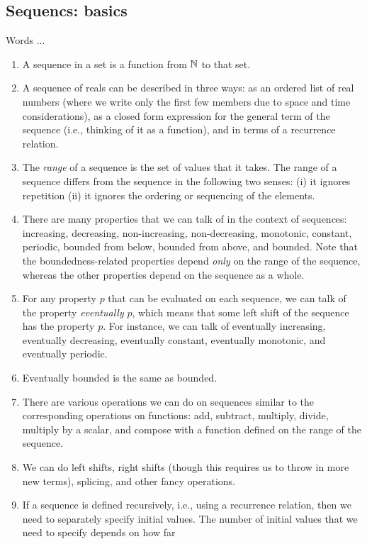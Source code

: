 \documentclass[10pt]{amsart}
\begin{document}
\subsection{Sequencs: basics}
Words ...

\begin{enumerate}
\item A sequence in a set is a function from $\mathbb{N}$ to that set.
\item A sequence of reals can be described in three ways: as an
  ordered list of real numbers (where we write only the first few
  members due to space and time considerations), as a closed form
  expression for the general term of the sequence (i.e., thinking of
  it as a function), and in terms of a recurrence relation.
\item The {\em range} of a sequence is the set of values that it
  takes. The range of a sequence differs from the sequence in the
  following two senses: (i) it ignores repetition (ii) it ignores the
  ordering or sequencing of the elements.
\item There are many properties that we can talk of in the context of
  sequences: increasing, decreasing, non-increasing, non-decreasing,
  monotonic, constant, periodic, bounded from below, bounded from
  above, and bounded. Note that the boundedness-related properties
  depend {\em only} on the range of the sequence, whereas the other
  properties depend on the sequence as a whole.
\item For any property $p$ that can be evaluated on each sequence, we
  can talk of the property {\em eventually} $p$, which means that some
  left shift of the sequence has the property $p$. For instance, we
  can talk of eventually increasing, eventually decreasing, eventually
  constant, eventually monotonic, and eventually periodic.
\item Eventually bounded is the same as bounded.
\item There are various operations we can do on sequences similar to
  the corresponding operations on functions: add, subtract, multiply,
  divide, multiply by a scalar, and compose with a function defined on
  the range of the sequence.
\item We can do left shifts, right shifts (though this requires us to
  throw in more new terms), splicing, and other fancy operations.
\item If a sequence is defined recursively, i.e., using a recurrence
  relation, then we need to separately specify initial values. The
  number of initial values that we need to specify depends on how far

\end{enumerate}
\end{document}
